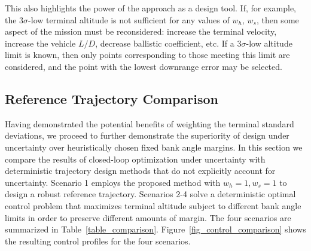 \documentclass[journal ]{new-aiaa}
\begin{document}
This also highlights the power of the approach as a design tool. If, for example, the $3\sigma$-low terminal altitude is not sufficient for any values of $w_h,\,w_s$, then some aspect of the mission must be reconsidered: increase the terminal velocity, increase the vehicle $L/D$, decrease ballistic coefficient, etc. If a $3\sigma$-low altitude limit is known, then only points corresponding to those meeting this limit are considered, and the point with the lowest downrange error may be selected. 

\subsection*{Reference Trajectory Comparison}
Having demonstrated the potential benefits of weighting the terminal standard deviations, we proceed to further demonstrate the superiority of design under uncertainty over heuristically chosen fixed bank angle margins.
In this section we compare the results of closed-loop optimization under uncertainty with deterministic trajectory design methods that do not explicitly account for uncertainty. Scenario 1 employs the proposed method with $w_h=1, w_s=1$ to design a robust reference trajectory. Scenarios 2-4 solve a deterministic optimal control problem that maximizes terminal altitude subject to different bank angle limits in order to preserve different amounts of margin. The four scenarios are summarized in Table~\ref{table_comparison}. Figure~\ref{fig_control_comparison} shows the resulting control profiles for the four scenarios.
\end{document}
